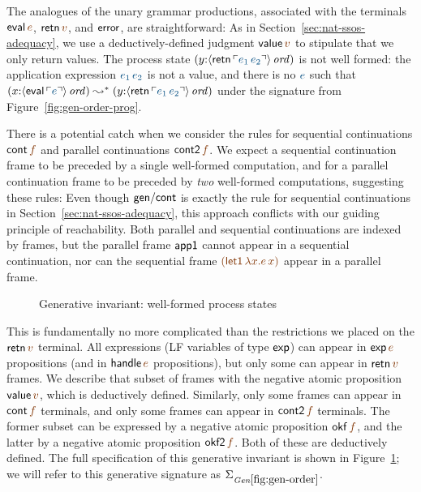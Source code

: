 The analogues of the unary grammar productions, associated with the
terminals ${\sf eval}\,\lf{e}$, ${\sf retn}\,\lf{v}$, and ${\sf
  error}$, are straightforward:
%
\smallskip
{}
\smallskip 
%
As in Section~\ref{sec:nat-ssos-adequacy}, we use a
deductively-defined judgment ${\sf value}\,\lf{v}$ to stipulate that
we only return values. The process state $(y{:}\istrue{\susp{{\sf
      retn}\,\interp{e_1\,e_2}}})$ is not well formed: the
application expression $\obj{e_1\,e_2}$ is not a value, and
there is no $\obj{e}$ such that $(x{:}\istrue{\susp{{\sf
      eval}\,\interp{e}}}) \leadsto^* (y{:}\istrue{\susp{{\sf
      retn}\,\interp{e_1\,e_2}}})$ under the signature from
Figure~\ref{fig:gen-order-prog}.

There is a potential catch when we consider the rules for sequential
continuations ${\sf cont}\,\lf{f}$ and parallel continuations ${\sf
  cont2}\,\lf{f}$. We expect a sequential continuation frame to be
preceded by a single well-formed computation, and for a parallel
continuation frame to be preceded by {\it two} well-formed
computations, suggesting these rules:
%
\smallskip
{}
\smallskip 
%
Even though ${\sf gen/cont}$ is exactly the rule for sequential
continuations in Section~\ref{sec:nat-ssos-adequacy}, this approach
conflicts with our guiding principle of reachability.
Both parallel and sequential continuations are indexed by
frames, but the parallel frame ${\sf app1}$ cannot appear in a
sequential continuation, nor can the sequential frame $\lf{({\sf
  let1}\,\lf{\lambda x.e\,x})}$ appear in a parallel frame. 

\begin{figure}[tp]
\caption{Generative invariant: well-formed process states}
\label{fig:gen-order} 
\end{figure}

This is fundamentally no more complicated than the restrictions we
placed on the ${\sf retn}\,\lf{v}$ terminal. All expressions (LF
variables of type ${\sf exp}$) can appear in ${\sf exp}\,\lf{e}$
propositions (and in ${\sf handle}\,\lf{e}$ propositions), but only
some can appear in ${\sf retn}\,\lf{v}$ frames. We describe that
subset of frames with the negative atomic proposition ${\sf
  value}\,\lf{v}$, which is deductively defined. Similarly, only some
frames can appear in ${\sf cont}\,\lf{f}$ terminals, and only some
frames can appear in ${\sf cont2}\,\lf{f}$ terminals. The former subset
can be expressed by a negative atomic proposition ${\sf okf}\,\lf{f}$,
and the latter by a negative atomic proposition ${\sf okf2}\,\lf{f}$.
Both of these are deductively defined.  The full specification of this
generative invariant is shown in Figure~\ref{fig:gen-order}; we will
refer to this generative signature as $\siggenorder$.

